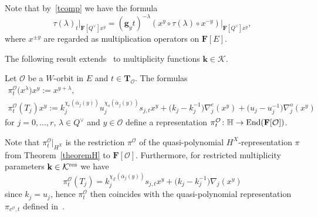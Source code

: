 Note that by~\eqref{tcomp} we have the formula
\[
\tau(\lambda)_t\vert_{\mathbf{F}[Q^\vee]x^y}=(\mathbf{g}_yt)^{-\lambda}(x^y\circ\tau(\lambda)\circ x^{-y})\vert_{\mathbf{F}[Q^\vee]x^y},
\]
where $x^{\pm y}$ are regarded as multiplication operators on $\mathbf{F}[E]$.

The following result extends~\cite[Theorem~1.1]{SSV2} to multiplicity functions $\mathbf{k}\in\mathcal{K}$.
\begin{Theorem}\label{mthm}
Let $\mathcal{O}$ be a $W$-orbit in $E$ and $t\in\mathbf{T}_\mathcal{O}$. The formulas
\begin{gather}
\pi_{t}^\mathcal{O}\bigl(x^\lambda\bigr)x^y:=x^{y+\lambda}, \nonumber\\
\pi_{t}^\mathcal{O}(T_j)x^y:=k_j^{\chi_e(\overline{\alpha}_j(y))}u_j^{\chi_o(\overline{\alpha}_j(y))}s_{j,t}x^y+\bigl(k_j-k_j^{-1}\bigr)\nabla_j^e(x^y)+
\bigl(u_j-u_j^{-1}\bigr)\nabla_j^o(x^y)
\label{qprepHH}
\end{gather}
for $j=0,\dots,r$, $\lambda\in Q^\vee$ and $y\in\mathcal{O}$ define a representation $\pi_{t}^\mathcal{O}\colon \mathbb{H}\rightarrow\textup{End}(\mathbf{F}[\mathcal{O}])$.
\end{Theorem}
\begin{Remark}
Note that $\pi_{t}^\mathcal{O}\vert_{H^X}$ is the restriction $\pi^{\mathcal{O}}$ of the quasi-polynomial $H^X$-represen\-tation $\pi$ from Theorem~\ref{theoremH} to $\mathbf{F}[\mathcal{O}]$. Furthermore, for restricted multiplicity
parameters $\mathbf{k}\in\mathcal{K}^{{\rm res}}$ we have
\[
\pi_{t}^\mathcal{O}(T_j)=k_j^{\chi_{\mathbb{Z}}(\overline{\alpha}_j(y))}s_{j,t}x^y+\bigl(k_j-k_j^{-1}\bigr)\nabla_j(x^y)
\]
since $k_j=u_j$, hence $\pi_{t}^\mathcal{O}$ then coincides with the quasi-polynomial representation $\pi_{c^\mathcal{O},t}$ defined in~\cite[Theorem~1.1]{SSV2}.
\end{Remark}
